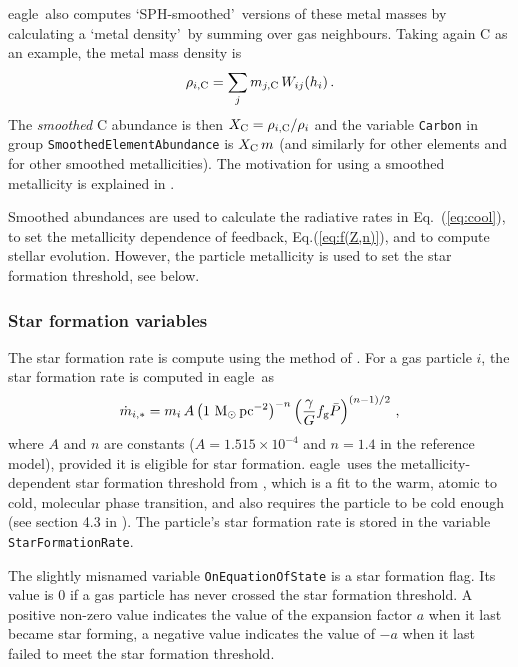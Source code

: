 \documentclass[10pt, a4paper]{article}
\newcommand{\eagle}{{\sc eagle}}
\begin{document}
\eagle\ also computes \lq SPH-smoothed\rq\ versions of these metal masses by
calculating a \lq metal density\rq\ by summing over gas neighbours. Taking
again C as an example, the metal mass density is \begin{equation} \rho_{i, {\rm
C}} = \sum_j m_{j, {\rm C}}\,W_{ij}(h_i)\,.  \end{equation} The {\em smoothed}
C abundance is then $X_{\rm C}=\rho_{i, {\rm C}}/\rho_i$ and the variable
\texttt{Carbon} in group \texttt{SmoothedElementAbundance} is $X_{\rm C}\,m$
(and similarly for other elements and for other smoothed metallicities). The
motivation for using a smoothed metallicity is explained in \cite{wiersma09b}.

Smoothed abundances are used to calculate the radiative rates in
Eq.~(\ref{eq:cool}), to set the metallicity dependence of feedback,
Eq.(\ref{eq:f(Z,n)}), and to compute stellar evolution. However, the particle
metallicity is used to set the star formation threshold, see below.

\subsubsection{Star formation variables}
\label{sect:sfr}
The star formation rate is compute using the method of \cite{schaye2008}. For a
gas particle $i$, the star formation rate is computed in \eagle\ as
\begin{equation} \dot{m}_{i,\ast} = m_i\, A \left (1~{\rm M}_\odot\,{\rm
pc}^{-2}\right)^{-n} \left ({\gamma \over G} f_{\rm g}
\bar{P}\right)^{(n-1)/2}\,, \label{eq:sflaw} \end{equation} where $A$ and $n$
are constants ($A=1.515\times 10^{-4}$ and $n=1.4$ in the {\sc reference}
model), provided it is eligible for star formation. \eagle\ uses the
metallicity-dependent star formation threshold from \cite{schaye2004}, which is
a fit to the warm, atomic to cold, molecular phase transition, and also
requires the particle to be cold enough (see section 4.3 in \cite{schaye2015}).
The particle's star formation rate is stored in the variable
\texttt{StarFormationRate}.

The slightly misnamed variable \texttt{OnEquationOfState} is a star formation
flag. Its value is 0 if a gas particle has never crossed the star formation
threshold. A positive non-zero value indicates the value of the expansion
factor $a$ when it last became star forming, a negative value indicates the
value of $-a$ when it last failed to meet the star formation threshold.
\end{document}
